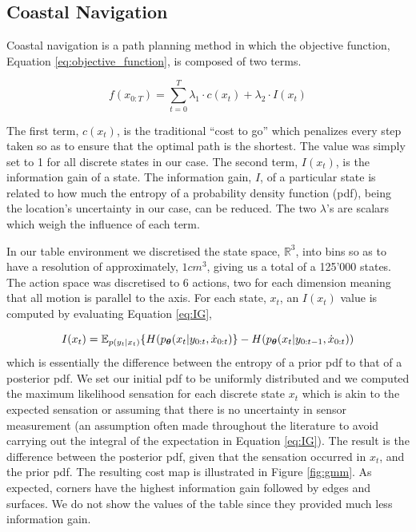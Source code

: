 \subsection{Coastal Navigation}\label{chap3:costal_policy}

Coastal navigation \cite{CostalNavigation1999} is a path planning method in which the objective function, 
Equation \ref{eq:objective_function}, is composed of two terms.

\begin{equation}\label{eq:objective_function}
 f(x_{0:T}) = \sum\limits_{t=0}^{T} \lambda_1 \cdot c(x_t) + \lambda_2 \cdot I(x_t)
\end{equation}

The first term, $c(x_t)$, is the traditional ``cost to go'' which penalizes every step taken so as to ensure that the
optimal path is the shortest. The value was simply set to 1 for all discrete states in our case. The second term, $I(x_t)$, 
is the information gain of a state. The information gain, $I$, of a particular state is related to how much 
the entropy of a probability density function (pdf), being the location's uncertainty in our case, can be reduced. The two $\lambda$'s are scalars which weigh the influence 
of each term.

In our table environment we discretised the state space, $\mathbb{R}^3$, into bins so as to have a resolution of approximately, $1 cm^3$, giving us a total of a 125'000
states. The action space was discretised to 6 actions, two for each dimension meaning that all motion is parallel to the axis. For each state, $x_t$, an $I(x_t)$ value is
computed by evaluating Equation \ref{eq:IG},


\begin{equation}\label{eq:IG}
 I(x_t) = \mathbb{E}_{p(y_t|x_t)}\{ H(p_{\boldsymbol{\theta}}(x_t|y_{0:t},\dot{x}_{0:t}) \} - H(p_{\boldsymbol{\theta}}(x_t|y_{0:t-1},\dot{x}_{0:t}))
\end{equation}
which is essentially the difference between the entropy of a prior pdf to that of a posterior pdf.
We set our initial pdf to be uniformly distributed and  we computed the maximum likelihood sensation for each discrete state $x_t$
which is akin to the expected sensation or assuming that there is no uncertainty in sensor measurement (an assumption 
often made throughout the literature to avoid carrying out the integral of the expectation in Equation \ref{eq:IG}).
The result is the difference between the posterior pdf, given that the sensation occurred in $x_t$, and the prior pdf. The resulting cost
map is illustrated in Figure \ref{fig:gmm}. As expected, corners have the highest information gain followed by edges and surfaces. 
We do not show the values of the table since they provided much less information gain.

